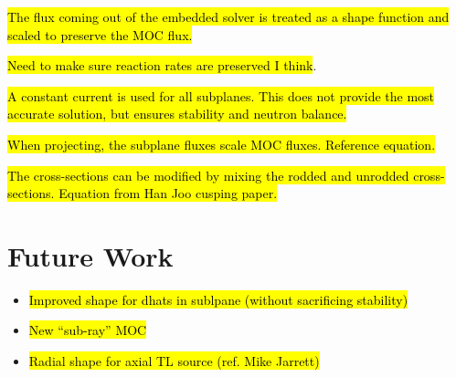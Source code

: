 \hl{The flux coming out of the embedded solver is treated as a shape function and scaled to preserve the MOC flux.}

\hl{Need to make sure reaction rates are preserved I think}.

\hl{A constant current is used for all subplanes.  This does not provide the most accurate solution, but ensures stability and neutron balance.}

\hl{When projecting, the subplane fluxes scale MOC fluxes.  Reference equation.}

\hl{The cross-sections can be modified by mixing the rodded and unrodded cross-sections.  Equation from Han Joo cusping paper.}

\section{Future Work}

\begin{itemize}
\item \hl{Improved shape for dhats in sublpane (without sacrificing stability)}
\item \hl{New ``sub-ray'' MOC}
\item \hl{Radial shape for axial TL source (ref. Mike Jarrett)}
\end{itemize}